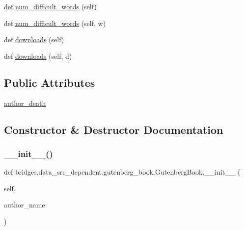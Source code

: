 \begin{DoxyCompactItemize}
\item 
def \hyperlink{classbridges_1_1data__src__dependent_1_1gutenberg__book_1_1_gutenberg_book_a5f616c4e018f44da77a861db528103fa}{num\+\_\+difficult\+\_\+words} (self)
\item 
def \hyperlink{classbridges_1_1data__src__dependent_1_1gutenberg__book_1_1_gutenberg_book_aceaae959361c8c9c2f2cddf7fa71e5eb}{num\+\_\+difficult\+\_\+words} (self, w)
\item 
def \hyperlink{classbridges_1_1data__src__dependent_1_1gutenberg__book_1_1_gutenberg_book_afb28a5f09f09aea1397d32bf075d847a}{downloads} (self)
\item 
def \hyperlink{classbridges_1_1data__src__dependent_1_1gutenberg__book_1_1_gutenberg_book_a5fe07e62aae174ef3c862f3f5ad7f6e6}{downloads} (self, d)
\end{DoxyCompactItemize}
\subsection*{Public Attributes}
\begin{DoxyCompactItemize}
\item 
\hyperlink{classbridges_1_1data__src__dependent_1_1gutenberg__book_1_1_gutenberg_book_afd78a02948accf9b270e7b9cb9e38856}{author\+\_\+death}
\end{DoxyCompactItemize}


\subsection{Constructor \& Destructor Documentation}
\mbox{\label{classbridges_1_1data__src__dependent_1_1gutenberg__book_1_1_gutenberg_book_ac44f922d6f63fc6ab3c0788ea9b9c4b5}} 
\subsubsection{\texorpdfstring{\+\_\+\+\_\+init\+\_\+\+\_\+()}{\_\_init\_\_()}}
{\footnotesize\ttfamily def bridges.\+data\+\_\+src\+\_\+dependent.\+gutenberg\+\_\+book.\+Gutenberg\+Book.\+\_\+\+\_\+init\+\_\+\+\_\+ (\begin{DoxyParamCaption}\item[{}]{self,  }\item[{}]{author\+\_\+name }\end{DoxyParamCaption})}



